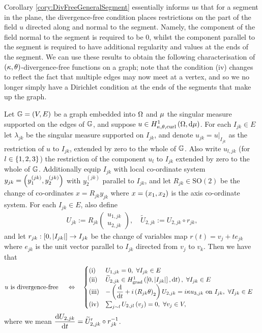 Corollary \ref{cory:DivFreeGeneralSegment} essentially informs us that for a segment in the plane, the divergence-free condition places restrictions on the part of the field $u$ directed along and normal to the segment.
Namely, the component of the field normal to the segment is required to be $0$, whilst the component parallel to the segment is required to have additional regularity and values at the ends of the segment.
We can use these results to obtain the following characterisation of $\left( \kappa, \theta \right)$-divergence-free functions on a graph; note that the condition (iv) changes to reflect the fact that multiple edges may now meet at a vertex, and so we no longer simply have a Dirichlet condition at the ends of the segments that make up the graph.
\begin{theorem} \label{thm:DivFreeWholeGraph}
	Let $\mathbb{G}=\left( V,E \right)$ be a graph embedded into $\Omega$ and $\mu$ the singular measure supported on the edges of $\mathbb{G}$, and suppose $u\in H^1_{\kappa,\theta,\mathrm{curl}}\left( \Omega, \mathrm{d}\mu \right)$.
	For each $I_{jk}\in E$ let $\lambda_{jk}$ be the singular measure supported on $I_{jk}$, and denote $u_{jk} = u\vert_{I_{jk}}$ as the restriction of $u$ to $I_{jk}$, extended by zero to the whole of $\mathbb{G}$.
	Also write $u_{l,jk}$ (for $l\in\left\{ 1,2,3 \right\}$) the restriction of the component $u_l$ to $I_{jk}$ extended by zero to the whole of $\mathbb{G}$.
	Additionally equip $I_{jk}$ with local co-ordinate system $y_{jk}=\left( y_1^{(jk)}, y_2^{(jk)} \right)$ with $y_2^{(jk)}$ parallel to $I_{jk}$, and let $R_{jk}\in\mathrm{SO}(2)$ be the change of co-ordinates $x=R_{jk}y_{jk}$ where $x=\left( x_1,x_2 \right)$ is the axis co-ordinate system.
	For each $I_{jk}\in E$, also define
	\begin{align*}
		U_{jk} := R_{jk}\begin{pmatrix} u_{1,jk} \\ u_{2,jk} \end{pmatrix}, \quad
		\widetilde{U}_{2,jk} := U_{2,jk} \circ r_{jk},
	\end{align*}
	and let $r_{jk}:\left[ 0,\left\lvert I_{jk} \right\rvert \right]\rightarrow I_{jk}$ be the change of variables map $r(t)=v_{j} + te_{jk}$ where $e_{jk}$ is the unit vector parallel to $I_{jk}$ directed from $v_j$ to $v_k$.
	Then we have that
	\begin{align*}
		u \text{ is divergence-free } &\quad\Leftrightarrow\quad
		\begin{cases}
		\mathrm{(i)} & U_{1,jk} = 0, \ \forall I_{jk}\in E\\
		\mathrm{(ii)} & \widetilde{U}_{2,jk} \in \gradSob{\interval{I_{jk}}}{t}, \ \forall I_{jk}\in E \\
		\mathrm{(iii)} & -\bracs{\diff{}{t} + i\bracs{R_{jk}\qm}_2}U_{2,jk} = i\wavenumber u_{3,jk} \text{ on } I_{jk}, \ \forall I_{jk}\in E\\
		\mathrm{(iv)} & \sum_{j\con l}U_{2,jl}\bracs{v_j} = 0, \ \forall v_j\in V,
		\end{cases}
	\end{align*}
	where we mean $\dfrac{\mathrm{d}U_{2,jk}}{\mathrm{d}t} = \widetilde{U}_{2,jk}' \circ r_{jk}^{-1}$.
\end{theorem}
